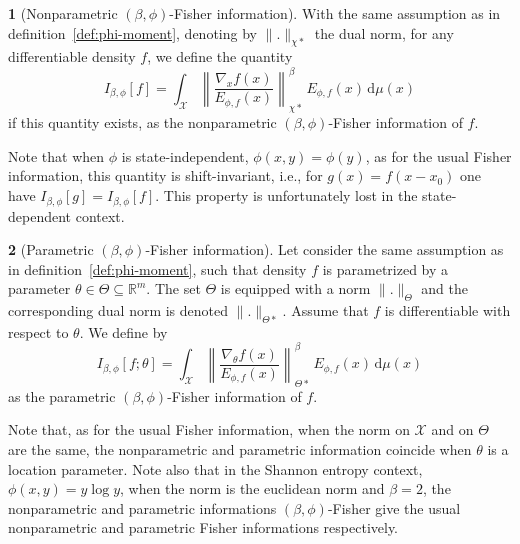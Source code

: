 \documentclass[english,sort&compress]{elsarticle}
\theoremstyle{definition}
\newtheorem{defn}{\protect\definitionname}
\theoremstyle{plain}
\theoremstyle{plain}
\providecommand{\definitionname}{Definition}
\def\dmu{\mathrm{d}\mu}
\def\Rset{\mathbb{R}}
\def\X{\mathcal{X}}
\begin{document}
\begin{defn}[Nonparametric $(\beta,\phi)$-Fisher information]\label{def:np-phi-Fisher}
  With the  same assumption  as in definition~\ref{def:phi-moment},  denoting by
  $\|.\|_{\chi*}$ the dual  norm, for any differentiable density  $f$, we define
  the quantity
  \begin{equation}\label{eq:np-phi-Fisher}
    I_{\beta,\phi}[f] = \int_\X \left\| \frac{\nabla_x f(x)}{E_{\phi,f}(x)}
    \right\|_{\chi*}^\beta \, E_{\phi,f}(x) \, \dmu(x)
  \end{equation}
  if   this  quantity   exists,  as   the   nonparametric  $(\beta,\phi)$-Fisher
  information of $f$.
\end{defn}
%
Note that  when $\phi$ is state-independent,  $\phi(x,y) = \phi(y)$,  as for the
usual Fisher information,  this quantity is shift-invariant, i.e.,  for $g(x) =
f(x-x_0)$  one have  $I_{\beta,\phi}[g] =  I_{\beta,\phi}[f]$. This  property is
unfortunately lost in the state-dependent context.

\begin{defn}[Parametric $(\beta,\phi)$-Fisher information]\label{def:p-phi-Fisher}
  Let consider  the same assumption as  in definition~\ref{def:phi-moment}, such
  that density $f$  is parametrized by a parameter  $\theta \in \Theta \subseteq
  \Rset^m$.  The set  $\Theta$ is equipped with a  norm $\|.\|_{\Theta}$ and the
  corresponding  dual norm  is denoted  $\|.\|_{\Theta*}$.  Assume  that  $f$ is
  differentiable with respect to $\theta$. We define by
  \begin{equation}\label{eq:p-phi-Fisher}
  I_{\beta,\phi}[f;\theta] = \int_\X \left\| \frac{\nabla_\theta
  f(x)}{E_{\phi,f}(x)} \right\|_{\Theta*}^\beta \, E_{\phi,f}(x) \, \dmu(x)
  \end{equation}
  as the parametric $(\beta,\phi)$-Fisher information of $f$.
\end{defn}
%
Note that, as  for the usual Fisher  information, when the norm on  $\X$ and on
$\Theta$  are the same,  the nonparametric  and parametric  information coincide
when $\theta$  is a location  parameter. Note also  that in the  Shannon entropy
context, $\phi(x,y) = y \log y$, when  the norm is the euclidean norm and $\beta
= 2$,  the nonparametric and parametric  informations $(\beta,\phi)$-Fisher give
the     usual    nonparametric     and     parametric    Fisher     informations
respectively.

\
\end{document}

